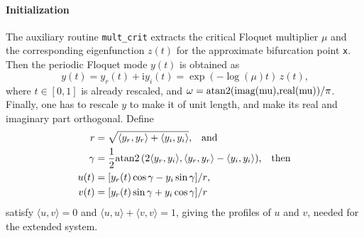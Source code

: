 \documentclass[11pt]{scrartcl}
\newcommand{\mt}[1]{\mathrm{#1}}
\renewcommand{\i}{\mt{i}}
\newcommand{\blist}[1]{\mbox{\lstinline!#1!}}
\begin{document}
\paragraph{Initialization}
The auxiliary routine \blist{mult_crit} extracts the critical Floquet
multiplier $\mu$ and the corresponding eigenfunction $z(t)$ for the
approximate bifurcation point \blist{x}. Then the periodic Floquet
mode $y(t)$ is obtained as
\begin{displaymath}
y(t)=y_r(t)+\i y_i(t)=\exp(-\log(\mu)t)\,z(t)\mbox{,}
\end{displaymath}
where $t\in[0,1]$ is already rescaled, and
$\omega=\blist{atan2(imag(mu),real(mu))}/\pi$. Finally, one has to
rescale $y$ to make it of unit length, and make its real and imaginary
part orthogonal. Define
\begin{align*}
  r&=\sqrt{\langle y_r,y_r\rangle+\langle
    y_i,y_i\rangle}\mbox{,\quad and }\\
  \gamma&=\frac{1}{2}\blist{atan2}\,(2\langle
  y_r,y_i\rangle,\langle
  y_r,y_r\rangle-\langle y_i,y_i\rangle)\mbox{,\quad then}\\
  u(t)&=[y_r(t)\cos\gamma-y_i\sin\gamma]/r\mbox{,}\\
  v(t)&=[y_r(t)\sin\gamma+y_i\cos\gamma]/r
\end{align*}
satisfy $\langle u,v\rangle=0$ and $\langle u,u\rangle+\langle
v,v\rangle=1$, giving the profiles of $u$ and $v$, needed for the
extended system.
\end{document}

